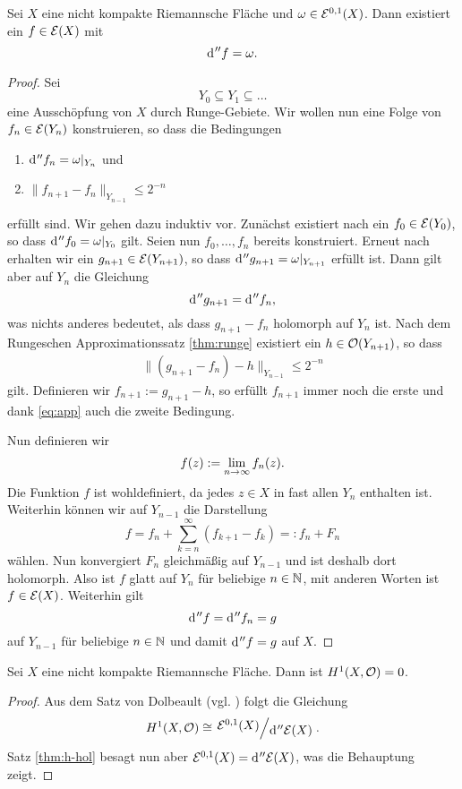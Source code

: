 \begin{thm}
  \label{thm:h-hol}
  Sei $X$ eine nicht kompakte Riemannsche Fläche und $\omega \in
  \mathcal{E}^{0,1}(X)$. Dann existiert ein $f \in \mathcal{E}(X)$ mit
  \[
  \d[''f] = \omega.
  \]
\end{thm}

\begin{proof}
  Sei
  \[
  Y_0 \subseteq Y_1 \subseteq \dots
  \]
  eine Ausschöpfung von $X$ durch Runge-Gebiete. Wir wollen nun eine
  Folge von \break$f_n \in \mathcal{E}(Y_n)$ konstruieren, so dass die Bedingungen
  \begin{enumerate}
  \item $\d[''f_n] = \omega|_{Y_n}$ und
  \item $\|f_{n+1} - f_n \|_{Y_{n-1}} \leq 2^{-n}$
  \end{enumerate}
  erfüllt sind. Wir gehen dazu induktiv vor. Zunächst existiert nach
  \cite[Kor. 14.16]{For} ein $f_0 \in \mathcal{E}(Y_0)$, so dass $\d[''f_0]
  = \omega|_{Y_0}$ gilt. Seien nun $f_0, \dots, f_n$ bereits
  konstruiert. Erneut nach \cite[Kor. 14.16]{For} erhalten wir ein
  $g_{n+1} \in \mathcal{E}(Y_{n+1})$, so dass $\d[''g_{n+1}] =
  \omega|_{Y_{n+1}}$ erfüllt ist. Dann gilt aber auf $Y_n$ die Gleichung
  \[
  \d['' g_{n+1}] = \d['' f_n],
  \]
  was nichts anderes bedeutet, als dass $g_{n+1} - f_n$ holomorph auf
  $Y_n$ ist. Nach dem Rungeschen Approximationssatz \ref{thm:runge}
  existiert ein $h \in \mathcal{O}(Y_{n+1})$, so dass
  \begin{align}
  \|(g_{n+1} - f_n) - h\|_{Y_{n-1}} \leq 2^{-n} \label{eq:app}
  \end{align}
  gilt. Definieren wir $f_{n+1} := g_{n+1} - h$, so erfüllt $f_{n+1}$
  immer noch die erste und dank \eqref{eq:app} auch die zweite
  Bedingung.

  Nun definieren wir
  \[
  f(z) := \lim_{n \rightarrow \infty} f_n(z).
  \]
  Die Funktion $f$ ist wohldefiniert, da jedes $z \in X$ in fast allen
  $Y_n$ enthalten ist. Weiterhin können wir auf $Y_{n-1}$ die Darstellung
  \[
  f = f_n + \sum_{k=n}^\infty (f_{k+1} - f_k) =: f_n + F_n
  \]
  wählen. Nun konvergiert $F_n$ gleichmäßig auf $Y_{n-1}$ und ist deshalb
  dort holomorph. Also ist $f$ glatt auf $Y_n$ für beliebige $n \in
  \mathbb{N}$, mit anderen Worten ist $f \in \mathcal{E}(X)$. Weiterhin gilt
  \[
  \d[''f] = \d['' f_n] = g
  \]
  auf $Y_{n-1}$ für beliebige $n \in \mathbb{N}$ und damit $\d[''f] = g$ auf $X$.
\end{proof}

\begin{cor}
  \label{cor:h-hol}
  Sei $X$ eine nicht kompakte Riemannsche Fläche. Dann ist $H^1(X,
  \mathcal{O}) = 0$.
\end{cor}

\begin{proof}
  Aus dem Satz von Dolbeault (vgl. \cite[Satz 15.14]{For}) folgt die
  Gleichung
  \[
  H^1(X, \hol) \cong \quot{\diff^{0,1}(X)}{\d['' \diff(X)]}.
  \]
  Satz \ref{thm:h-hol} besagt nun aber $\diff^{0,1}(X) =
  \d[''\diff(X)]$, was die Behauptung zeigt.
\end{proof}

